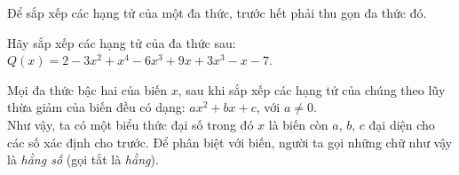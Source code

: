 \begin{note}
	Để sắp xếp các hạng tử của một đa thức, trước hết phải thu gọn đa thức đó.
\end{note}

\begin{vd}%
	Hãy sắp xếp các hạng tử của đa thức sau: $Q(x) = 2 - 3x^2 + x^4 - 6x^3 + 9x + 3x^3 - x - 7$.
\end{vd}

\begin{nx}
	Mọi đa thức bậc hai của biến $x$, sau khi sắp xếp các hạng tử của chúng theo lũy thừa giảm của biến đều có dạng: $ax^2 + bx + c$, với $a \neq 0$.\\
	Như vậy, ta có một biểu thức đại số trong đó $x$ là biến còn $a$, $b$, $c$ đại diện cho các số xác định cho trước. Để phân biệt với biến, người ta gọi những chữ như vậy là \textit{hằng số} (gọi tắt là \textit{hằng}).
\end{nx}

